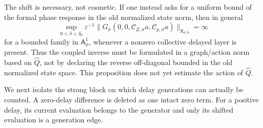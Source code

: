 \begin{proposition}
The shift is necessary, not cosmetic.  If one instead asks for a uniform
bound of the formal phase response in the old normalized state norm, then
in general
\begin{equation}
 \sup_{0<\delta<\delta_0}
 \varepsilon^{-1}
 \|G_\sigma(0,0,\mathscr C_{Z,\sigma}a,
                       \mathscr C_{p,\sigma}a)\|_{
                       \mathsf X_{\sigma,0}}=\infty           \label{eq:normalized-phase-response-obstruction}
\end{equation}
for a bounded family in \(\mathsf A_\phi^1\), whenever a nonzero collective
delayed layer is present.  Thus the coupled inverse must be formulated in a
graph/action norm based on \(\widehat Q\), not by declaring the reverse
off-diagonal bounded in the old normalized state space.  This proposition
does not yet estimate the action of \(\widehat Q\).
\end{proposition}

We next isolate the strong block on which delay generations can actually be
counted.  A zero-delay difference is deleted as one intact zero term.  For a
positive delay, its current evaluation belongs to the generator and only its
shifted evaluation is a generation edge.


